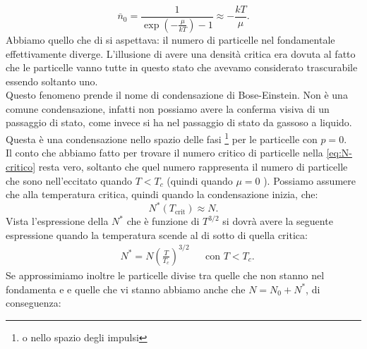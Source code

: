 \[
	\overline{n}_{0} = \frac{1}
		{\exp\left( -\frac{\mu }{kT} \right) -1 } \approx - \frac{kT}{\mu }
.\] 
Abbiamo quello che di si aspettava: il numero di particelle nel fondamentale effettivamente diverge. L'illusione di avere una densità critica era dovuta al fatto che le particelle vanno tutte in questo stato che avevamo considerato trascurabile essendo soltanto uno. \\ 
Questo fenomeno prende il nome di condensazione di Bose-Einstein. 
Non è una comune condensazione, infatti non possiamo avere la conferma visiva di un passaggio di stato, come invece si ha nel passaggio di stato da gassoso a liquido. 
Questa è una condensazione nello spazio delle fasi \footnote{o nello spazio degli impulsi} per le particelle con $p =0$. \\
Il conto che abbiamo fatto per trovare il numero critico di particelle nella \ref{eq:N-critico} resta vero, soltanto che quel numero rappresenta il numero di particelle che sono nell'eccitato quando $T< T_{c}$ (quindi quando $\mu = 0$ ). Possiamo assumere che alla temperatura critica, quindi quando la condensazione inizia, che:
\[
	N^{*}( T_{\text{crit}})  \approx N
.\] 
Vista l'espressione della $N^{*}$ che è funzione di $T^{3 /2}$ si dovrà avere la seguente espressione quando la temperatura scende al di sotto di quella critica:
\begin{align}
	&N^{*} = N \left( \frac{T}{T_{c}} \right)^{3 /2}& & \text{con } T<T_{c}
.\end{align}
Se approssimiamo inoltre le particelle divise tra quelle che non stanno nel fondamenta e e quelle che vi stanno abbiamo anche che $N = N_0 + N^{*}$, di conseguenza:
%
